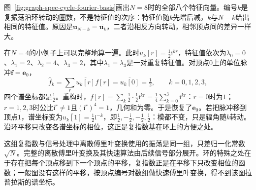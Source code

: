 图~\ref{fig:graph-spec-cycle-fourier-basis}画出$N=8$时的全部八个特征向量。编号$k$是复振荡沿环转动的圈数，不是特征值的次序：特征值随$k$先增后减，$k$与$N-k$给出相同的特征值。原因是$\bm u_{N-k}=\overline{\bm u_k}$，二者沿相反方向转动，相邻顶点间的差异一样大。

在$N=4$的小例子上可以完整地算一遍。此时$u_k[r]=\tfrac12\mathrm i^{kr}$，特征值依次为$\lambda_0=0$、$\lambda_1=2$、$\lambda_2=4$、$\lambda_3=2$，其中$\lambda_1=\lambda_3$是一对重复特征值。对顶点$0$上的单位脉冲$\bm f=\bm e_0$，
\[
 \widehat f_k=\sum_r\overline{u_k[r]}f[r]=\overline{u_k[0]}=\tfrac12,\qquad k=0,1,2,3 ,
\]
四个谱坐标都是$\tfrac12$。重构时，$f[r]=\sum_k\tfrac12\cdot\tfrac12\mathrm i^{kr}=\tfrac14\sum_{k=0}^3\mathrm i^{kr}$：$r=0$时为$1$；$r=1,2,3$时公比$\mathrm i^r\neq1$且$(\mathrm i^r)^4=1$，几何和为零。于是恢复了$\bm e_0$。若把脉冲移到顶点$1$，谱坐标变为$\overline{u_k[1]}=\tfrac12\mathrm i^{-k}$，即$\tfrac12,-\tfrac{\mathrm i}2,-\tfrac12,\tfrac{\mathrm i}2$：模都不变，只是辐角随$k$转动。沿环平移只改变各谱坐标的相位，这正是复指数基在环上的方便之处。

这组复指数与信号处理中离散傅里叶变换使用的振荡是同一组，只差归一化常数$\sqrt N$。完整的离散傅里叶变换及其快速算法由后续信号部分展开。环的特殊之处在于存在把每个顶点移到下一个顶点的平移，复指数正是在平移下只改变相位的函数；一般图没有这样的平移，按顶点编号对数组做快速傅里叶变换，得不到该图拉普拉斯的谱坐标。

